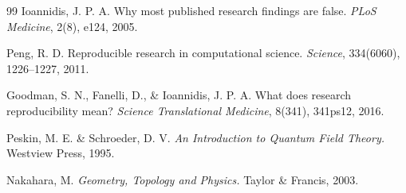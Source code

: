 \documentclass[12pt,a4paper]{article}
\theoremstyle{remark}
\begin{document}
\begin{thebibliography}{99}
Ioannidis, J. P. A.
Why most published research findings are false.
\textit{PLoS Medicine}, 2(8), e124, 2005.

Peng, R. D.
Reproducible research in computational science.
\textit{Science}, 334(6060), 1226--1227, 2011.

Goodman, S. N., Fanelli, D., \& Ioannidis, J. P. A.
What does research reproducibility mean?
\textit{Science Translational Medicine}, 8(341), 341ps12, 2016.

Peskin, M. E. \& Schroeder, D. V.
\textit{An Introduction to Quantum Field Theory.}
Westview Press, 1995.

Nakahara, M.
\textit{Geometry, Topology and Physics.}
Taylor \& Francis, 2003.

\end{thebibliography}
\end{document}
